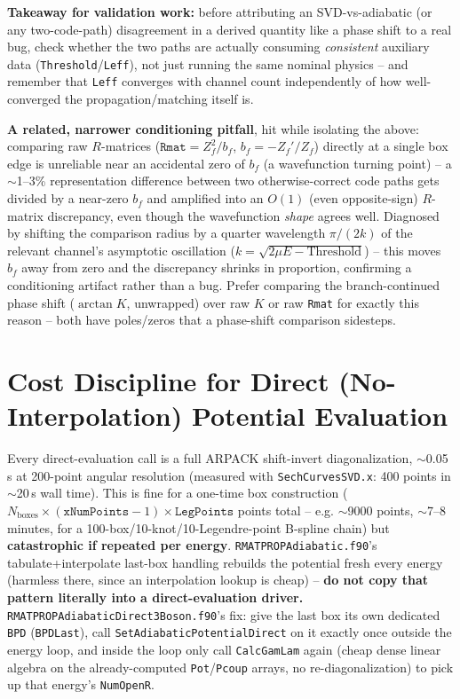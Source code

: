 \documentclass[11pt]{article}
\newcommand{\file}[1]{\texttt{#1}}
\newcommand{\sub}[1]{\texttt{#1}}
\begin{document}
\textbf{Takeaway for validation work:} before attributing an SVD-vs-adiabatic (or any two-code-path)
disagreement in a derived quantity like a phase shift to a real bug, check whether the two paths are
actually consuming \emph{consistent} auxiliary data (\texttt{Threshold}/\texttt{Leff}), not just
running the same nominal physics -- and remember that \texttt{Leff} converges with channel count
independently of how well-converged the propagation/matching itself is.

\textbf{A related, narrower conditioning pitfall}, hit while isolating the above: comparing raw
$R$-matrices ($\texttt{Rmat}=Z_f^2/b_f$, $b_f=-Z_f'/Z_f$) directly at a single box edge is unreliable
near an accidental zero of $b_f$ (a wavefunction turning point) -- a $\sim$1--3\% representation
difference between two otherwise-correct code paths gets divided by a near-zero $b_f$ and amplified
into an $O(1)$ (even opposite-sign) $R$-matrix discrepancy, even though the wavefunction \emph{shape}
agrees well. Diagnosed by shifting the comparison radius by a quarter wavelength
$\pi/(2k)$ of the relevant channel's asymptotic oscillation ($k=\sqrt{2\mu E-\text{Threshold}}$) --
this moves $b_f$ away from zero and the discrepancy shrinks in proportion, confirming a conditioning
artifact rather than a bug. Prefer comparing the branch-continued phase shift ($\arctan K$,
unwrapped) over raw $K$ or raw \texttt{Rmat} for exactly this reason -- both have poles/zeros that a
phase-shift comparison sidesteps.

\section{Cost Discipline for Direct (No-Interpolation) Potential Evaluation}
\label{sec:directcost}

Every direct-evaluation call is a full ARPACK shift-invert diagonalization,
$\sim$0.05\,s at 200-point angular resolution (measured with \file{SechCurvesSVD.x}: 400
points in $\sim$20\,s wall time). This is fine for a one-time box construction
($N_{\text{boxes}}\times(\texttt{xNumPoints}-1)\times\texttt{LegPoints}$ points total -- e.g.
$\sim$9000 points, $\sim$7--8 minutes, for a 100-box/10-knot/10-Legendre-point B-spline chain) but
\textbf{catastrophic if repeated per energy}. \file{RMATPROPAdiabatic.f90}'s tabulate+interpolate
last-box handling rebuilds the potential fresh every energy (harmless there, since an interpolation
lookup is cheap) -- \textbf{do not copy that pattern literally into a direct-evaluation driver.}
\file{RMATPROPAdiabaticDirect3Boson.f90}'s fix: give the last box its own dedicated \texttt{BPD}
(\texttt{BPDLast}), call \sub{SetAdiabaticPotentialDirect} on it exactly once outside the energy
loop, and inside the loop only call \sub{CalcGamLam} again (cheap dense linear algebra on the
already-computed \texttt{Pot}/\texttt{Pcoup} arrays, no re-diagonalization) to pick up that
energy's \texttt{NumOpenR}.
\end{document}
